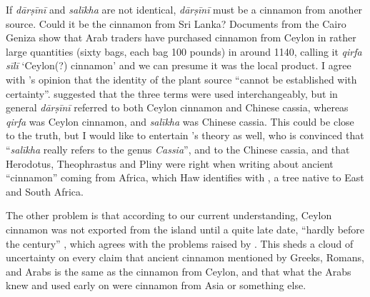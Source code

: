 If \textit{dārṣīnī} and \textit{salīkha} are not identical, \textit{dārṣīnī} must be a cinnamon from another source. Could it be the cinnamon from Sri Lanka? Documents from the Cairo Geniza show that Arab traders have purchased cinnamon from Ceylon in rather large quantities (sixty bags, each bag 100 pounds) in around 1140, calling it \textit{qirfa sīlī} `Ceylon(?) cinnamon' \parencites[375]{goitein_india_2008} and we can presume it was the local product. I agree with \textcite{dietrich_dar_2004}'s opinion that the identity of the plant source ``cannot be established with certainty''. \textcite[143-144]{lev_practical_2008} suggested that the three terms were used interchangeably, but in general \textit{dārṣīnī} referred to both Ceylon cinnamon and Chinese cassia, whereas \textit{qirfa} was Ceylon cinnamon, and \textit{salīkha} was Chinese cassia. This could be close to the truth, but I would like to entertain \textcite{haw_cinnamon_2017}'s theory as well, who is convinced that ``\textit{salīkha} really refers to the genus \textit{Cassia}'', and to the Chinese cassia,
and that Herodotus, Theophrastus and Pliny were right when writing about ancient ``cinnamon'' coming from Africa, which Haw identifies with , a tree native to East and South Africa.

The other problem is that according to our current understanding, Ceylon cinnamon was not exported from the island until a quite late date, ``hardly before the  century'' \parencite{dietrich_dar_2004}, which agrees with the problems raised by \textcite{haw_cinnamon_2017}. This sheds a cloud of uncertainty on every claim that ancient cinnamon mentioned by Greeks, Romans, and Arabs is the same as the cinnamon from Ceylon, and that what the Arabs knew and used early on were cinnamon from Asia or something else.

